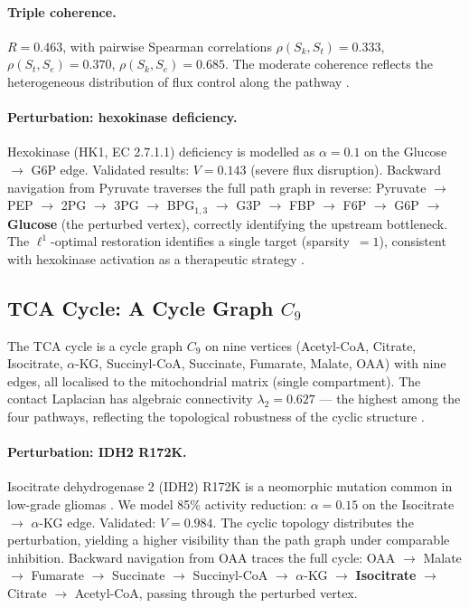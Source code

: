 \documentclass[11pt,twocolumn]{article}
\theoremstyle{plain}
\theoremstyle{definition}
\newcommand{\Sk}{S_k}
\newcommand{\St}{S_t}
\newcommand{\Se}{S_e}
\begin{document}
\paragraph{Triple coherence.}
$R = 0.463$, with pairwise Spearman correlations $\rho(\Sk, \St) = 0.333$,
$\rho(\St, \Se) = 0.370$, $\rho(\Sk, \Se) = 0.685$. The moderate coherence
reflects the heterogeneous distribution of flux control along the pathway
\cite{kacser1973control, fell1992metabolic}.

\paragraph{Perturbation: hexokinase deficiency.}
Hexokinase (HK1, EC 2.7.1.1) deficiency is modelled as $\alpha = 0.1$ on the
Glucose $\to$ G6P edge. Validated results:
$V = 0.143$ (severe flux disruption). Backward navigation from Pyruvate
traverses the full path graph in reverse: Pyruvate $\to$ PEP $\to$ 2PG $\to$
3PG $\to$ BPG$_{1,3}$ $\to$ G3P $\to$ FBP $\to$ F6P $\to$ G6P $\to$
\textbf{Glucose} (the perturbed vertex), correctly identifying the upstream
bottleneck. The $\ell^1$-optimal restoration identifies a single target
(sparsity~$= 1$), consistent with hexokinase activation as a therapeutic
strategy \cite{csermely2013structure}.

\subsection{TCA Cycle: A Cycle Graph $C_9$}

The TCA cycle is a cycle graph $C_9$ on nine vertices (Acetyl-CoA, Citrate,
Isocitrate, $\alpha$-KG, Succinyl-CoA, Succinate, Fumarate, Malate, OAA) with
nine edges, all localised to the mitochondrial matrix (single compartment).
The contact Laplacian has algebraic connectivity $\lambda_2 = 0.627$ --- the
highest among the four pathways, reflecting the topological robustness of the
cyclic structure \cite{kitano2004biological}.

\paragraph{Perturbation: IDH2 R172K.}
Isocitrate dehydrogenase 2 (IDH2) R172K is a neomorphic mutation common in
low-grade gliomas \cite{csermely2013structure}. We model 85\% activity
reduction: $\alpha = 0.15$ on the Isocitrate $\to$ $\alpha$-KG edge.
Validated: $V = 0.984$. The cyclic topology distributes the perturbation,
yielding a higher visibility than the path graph under comparable inhibition.
Backward navigation from OAA traces the full cycle: OAA $\to$ Malate $\to$
Fumarate $\to$ Succinate $\to$ Succinyl-CoA $\to$ $\alpha$-KG $\to$
\textbf{Isocitrate} $\to$ Citrate $\to$ Acetyl-CoA, passing through the
perturbed vertex.
\end{document}
